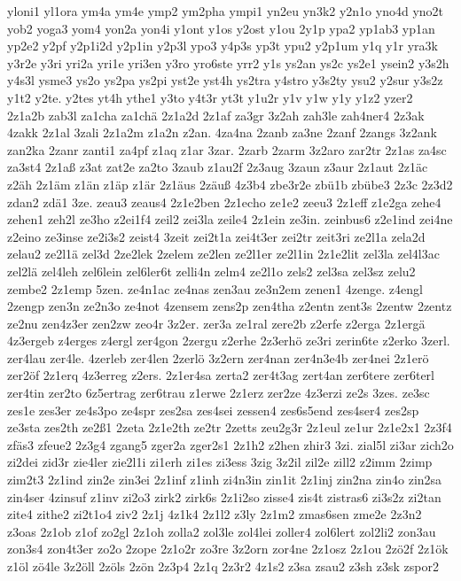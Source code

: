 {yloni1
yl1ora
ym4a
ym4e
ymp2
ym2pha
ympi1
yn2eu
yn3k2
y2n1o
yno4d
yno2t
yob2
yoga3
yom4
yon2a
yon4i
y1ont
y1os
y2ost
y1ou
2y1p
ypa2
yp1ab3
yp1an
yp2e2
y2pf
y2p1i2d
y2p1in
y2p3l
ypo3
y4p3s
yp3t
ypu2
y2p1um
y1q
y1r
yra3k
y3r2e
y3ri
yri2a
yri1e
yri3en
y3ro
yro6ste
yrr2
y1s
ys2an
ys2c
ys2e1
ysein2
y3s2h
y4s3l
ysme3
ys2o
ys2pa
ys2pi
yst2e
yst4h
ys2tra
y4stro
y3s2ty
ysu2
y2sur
y3s2z
y1t2
y2te.
y2tes
yt4h
ythe1
y3to
y4t3r
yt3t
y1u2r
y1v
y1w
y1y
y1z2
yzer2
2z1a2b
zab3l
za1cha
za1chä
2z1a2d
2z1af
za3gr
3z2ah
zah3le
zah4ner4
2z3ak
4zakk
2z1al
3zali
2z1a2m
z1a2n
z2an.
4za4na
2zanb
za3ne
2zanf
2zangs
3z2ank
zan2ka
2zanr
zanti1
za4pf
z1aq
z1ar
3zar.
2zarb
2zarm
3z2aro
zar2tr
2z1as
za4sc
za3st4
2z1aß
z3at
zat2e
za2to
3zaub
z1au2f
2z3aug
3zaun
z3aur
2z1aut
2z1äc
z2äh
2z1äm
z1än
z1äp
z1är
2z1äus
2zäuß
4z3b4
zbe3r2e
zbü1b
zbübe3
2z3c
2z3d2
zdan2
zdä1
3ze.
zeau3
zeaus4
2z1e2ben
2z1echo
ze1e2
zeeu3
2z1eff
z1e2ga
zehe4
zehen1
zeh2l
ze3ho
z2ei1f4
zeil2
zei3la
zeile4
2z1ein
ze3in.
zeinbus6
z2e1ind
zei4ne
z2eino
ze3inse
ze2i3s2
zeist4
3zeit
zei2t1a
zei4t3er
zei2tr
zeit3ri
ze2l1a
zela2d
zelau2
ze2l1ä
zel3d
2ze2lek
2zelem
ze2len
ze2l1er
ze2l1in
2z1e2lit
zel3la
zel4l3ac
zel2lä
zel4leh
zel6lein
zel6ler6t
zelli4n
zelm4
ze2l1o
zels2
zel3sa
zel3sz
zelu2
zembe2
2z1emp
5zen.
ze4n1ac
ze4nas
zen3au
ze3n2em
zenen1
4zenge.
z4engl
2zengp
zen3n
ze2n3o
ze4not
4zensem
zens2p
zen4tha
z2entn
zent3s
2zentw
2zentz
ze2nu
zen4z3er
zen2zw
zeo4r
3z2er.
zer3a
ze1ral
zere2b
z2erfe
z2erga
2z1ergä
4z3ergeb
z4erges
z4ergl
zer4gon
2zergu
z2erhe
2z3erhö
ze3ri
zerin6te
z2erko
3zerl.
zer4lau
zer4le.
4zerleb
zer4len
2zerlö
3z2ern
zer4nan
zer4n3e4b
zer4nei
2z1erö
zer2öf
2z1erq
4z3erreg
z2ers.
2z1er4sa
zerta2
zer4t3ag
zert4an
zer6tere
zer6terl
zer4tin
zer2to
6z5ertrag
zer6trau
z1erwe
2z1erz
zer2ze
4z3erzi
ze2s
3zes.
ze3sc
zes1e
zes3er
ze4s3po
ze4spr
zes2sa
zes4sei
zessen4
zes6s5end
zes4ser4
zes2sp
ze3sta
zes2th
ze2ß1
2zeta
2z1e2th
ze2tr
2zetts
zeu2g3r
2z1eul
ze1ur
2z1e2x1
2z3f4
zfäs3
zfeue2
2z3g4
zgang5
zger2a
zger2s1
2z1h2
z2hen
zhir3
3zi.
zial5l
zi3ar
zich2o
zi2dei
zid3r
zie4ler
zie2l1i
zi1erh
zi1es
zi3ess
3zig
3z2il
zil2e
zill2
z2imm
2zimp
zim2t3
2z1ind
zin2e
zin3ei
2z1inf
z1inh
zi4n3in
zin1it
2z1inj
zin2na
zin4o
zin2sa
zin4ser
4zinsuf
z1inv
zi2o3
zirk2
zirk6s
2z1i2so
zisse4
zis4t
zistras6
zi3s2z
zi2tan
zite4
zithe2
zi2t1o4
ziv2
2z1j
4z1k4
2z1l2
z3ly
2z1m2
zmas6sen
zme2e
2z3n2
z3oas
2z1ob
z1of
zo2gl
2z1oh
zolla2
zol3le
zol4lei
zoller4
zol6lert
zol2li2
zon3au
zon3s4
zon4t3er
zo2o
2zope
2z1o2r
zo3re
3z2orn
zor4ne
2z1osz
2z1ou
2zö2f
2z1ök
z1öl
zö4le
3z2öll
2zöls
2zön
2z3p4
2z1q
2z3r2
4z1s2
z3sa
zsau2
z3sh
z3sk
zspor2
}
